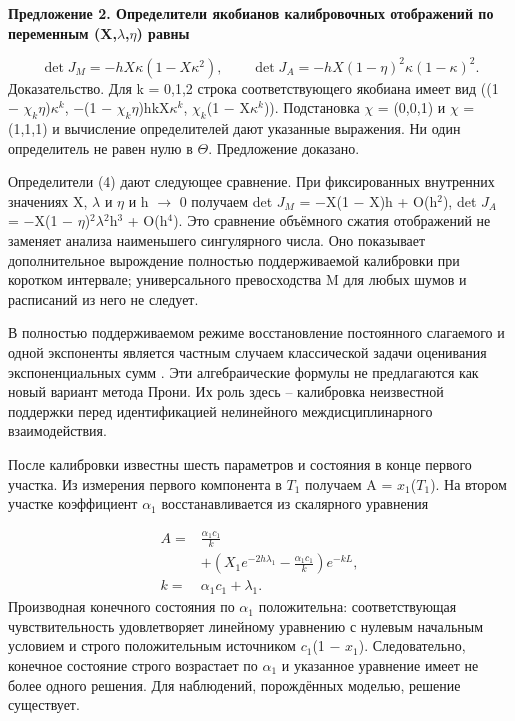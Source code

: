 \documentclass[blind]{psta}
\begin{document}
\par\medskip\noindent\textbf{Предложение 2. Определители якобианов калибровочных отображений по переменным (X,$\lambda$,$\eta$) равны}\par\smallskip
\begin{equation}
\det J_M=-hX\kappa (1-X\kappa ^2),\qquad \det J_A=-hX(1-\eta)^2\kappa (1-\kappa )^2.
\tag{4}
\label{eq:4}
\end{equation}
Доказательство. Для k = 0,1,2 строка соответствующего якобиана имеет вид ((1 $-$ $\chi_{k}$$\eta$)$\kappa$$^{k}$, $-$(1 $-$ $\chi_{k}$$\eta$)hkX$\kappa$$^{k}$, $\chi_{k}$(1 $-$ X$\kappa$$^{k}$)). Подстановка $\chi$ = (0,0,1) и $\chi$ = (1,1,1) и вычисление определителей дают указанные выражения. Ни один определитель не равен нулю в $\Theta$. Предложение доказано.

Определители (4) дают следующее сравнение. При фиксированных внутренних значениях X, $\lambda$ и $\eta$ и h $\to$ 0 получаем det $J_{M}$ = $-$X(1 $-$ X)h + O(h$^{2}$), det $J_{A}$ = $-$X(1 $-$ $\eta$)$^{2}$$\lambda$$^{2}$h$^{3}$ + O(h$^{4}$). Это сравнение объёмного сжатия отображений не заменяет анализа наименьшего сингулярного числа. Оно показывает дополнительное вырождение полностью поддерживаемой калибровки при коротком интервале; универсального превосходства M для любых шумов и расписаний из него не следует.

В полностью поддерживаемом режиме восстановление постоянного слагаемого и одной экспоненты является частным случаем классической задачи оценивания экспоненциальных сумм \cite{ref13}. Эти алгебраические формулы не предлагаются как новый вариант метода Прони. Их роль здесь – калибровка неизвестной поддержки перед идентификацией нелинейного междисциплинарного взаимодействия.

После калибровки известны шесть параметров и состояния в конце первого участка. Из измерения первого компонента в $T_{1}$ получаем A = $x_{1}$($T_{1}$). На втором участке коэффициент $\alpha_{1}$ восстанавливается из скалярного уравнения

\[
\begin{aligned}A=&\frac{\alpha_1c_1}{k}\\&+\left(X_1e^{-2h\lambda_1}-\frac{\alpha_1c_1}{k}\right)e^{-kL},\\k=&\alpha_1c_1+\lambda_1.\end{aligned}
\]
Производная конечного состояния по $\alpha_{1}$ положительна: соответствующая чувствительность удовлетворяет линейному уравнению с нулевым начальным условием и строго положительным источником $c_{1}$(1 $-$ $x_{1}$). Следовательно, конечное состояние строго возрастает по $\alpha_{1}$ и указанное уравнение имеет не более одного решения. Для наблюдений, порождённых моделью, решение существует.
\end{document}
